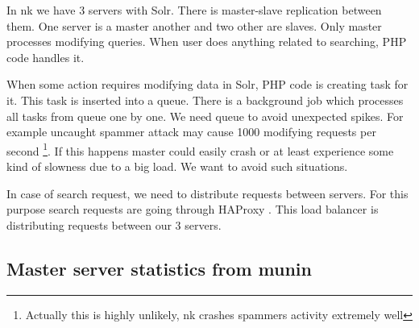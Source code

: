 \documentclass[10pt,a4paper]{article}
\begin{document}
In nk we have 3 servers with Solr. There is master-slave replication between them. One server is a master another and two other are slaves. Only master processes modifying queries. When user does anything related to searching, PHP code handles it.

When some action requires modifying data in Solr, PHP code is creating task for it. This task is inserted into a queue. There is a background job which processes all tasks from queue one by one. We need queue to avoid unexpected spikes. For example uncaught spammer attack may cause 1000 modifying requests per second \footnote{Actually this is highly unlikely, nk crashes spammers activity extremely well}. If this happens master could easily crash or at least experience some kind of slowness due to a big load. We want to avoid such situations. 

In case of search request, we need to distribute requests between servers. For this purpose search requests are going through HAProxy \cite{HAPROXY}. This load balancer is distributing requests between our 3 servers.

\subsection{Master server statistics from munin}
\end{document}
